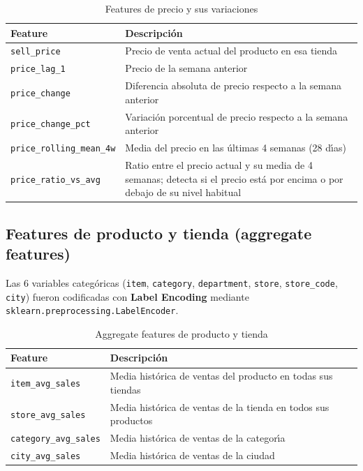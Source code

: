 \documentclass[12pt, a4paper, oneside]{report}
\newcommand{\code}[1]{\texttt{\small\color{codeblue}#1}}
\begin{document}
\begin{table}[H]
  \centering
  \caption{Features de precio y sus variaciones}
  \label{tab:price_features}
  \begin{tabularx}{\textwidth}{L{3.8cm} X}
    \toprule
    {\color{white}\textbf{Feature}} & {\color{white}\textbf{Descripci\'on}} \\
    \midrule
       \code{sell\_price}             & Precio de venta actual del producto en esa tienda \\
      \code{price\_lag\_1}           & Precio de la semana anterior \\
       \code{price\_change}           & Diferencia absoluta de precio respecto a la semana anterior \\
      \code{price\_change\_pct}      & Variaci\'on porcentual de precio respecto a la semana anterior \\
       \code{price\_rolling\_mean\_4w}& Media del precio en las \'ultimas 4 semanas (28 d\'{\i}as) \\
      \code{price\_ratio\_vs\_avg}   & Ratio entre el precio actual y su media de 4 semanas; detecta si el precio est\'a por encima o por debajo de su nivel habitual \\
    \bottomrule
  \end{tabularx}
\end{table}

\subsection{Features de producto y tienda (aggregate features)}

Las 6 variables categ\'oricas (\code{item}, \code{category}, \code{department}, \code{store}, \code{store\_code}, \code{city}) fueron codificadas con \textbf{Label Encoding} mediante \code{sklearn.preprocessing.LabelEncoder}.

\begin{table}[H]
  \centering
  \caption{Aggregate features de producto y tienda}
  \label{tab:agg_features}
  \begin{tabularx}{\textwidth}{L{3.8cm} X}
    \toprule
    {\color{white}\textbf{Feature}} & {\color{white}\textbf{Descripci\'on}} \\
    \midrule
       \code{item\_avg\_sales}      & Media hist\'orica de ventas del producto en todas sus tiendas \\
      \code{store\_avg\_sales}     & Media hist\'orica de ventas de la tienda en todos sus productos \\
       \code{category\_avg\_sales}  & Media hist\'orica de ventas de la categor\'{\i}a \\
      \code{city\_avg\_sales}      & Media hist\'orica de ventas de la ciudad \\
    \bottomrule
  \end{tabularx}
\end{table}
\end{document}
